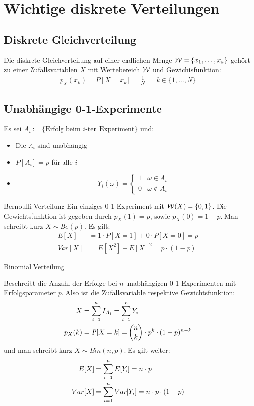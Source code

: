 \section{Wichtige diskrete Verteilungen}
\subsection{Diskrete Gleichverteilung}
Die diskrete Gleichverteilung auf einer endlichen Menge $\mathcal{W} = \{ x_1, \dots,
  x_n \}$ gehört zu einer Zufallsvariablen $X$ mit Wertebereich $\mathcal{W}$ und
Gewichtsfunktion:
\begin{align*}
  p_X (x_k) = P[X = x_k] = \frac{1}{N} &  & k \in \{1, \dots, N\}
\end{align*}
\subsection{Unabhängige 0-1-Experimente}
Es sei $A_i := \{\text{Erfolg beim $i$-ten Experiment}\}$ und:
\begin{itemize}
  \item Die $A_i$ sind unabhängig
  \item $P[A_i] = p$ für alle $i$
  \item \[
          Y_i (\omega) =
          \begin{cases}
            1 & \omega \in A_i      \\
            0 & \omega \not \in A_i
          \end{cases}
        \]
\end{itemize}
\begin{definition}{Bernoulli-Verteilung}
Ein einziges 0-1-Experiment mit $\mathcal{W} (X) = \{0, 1\}$. Die Gewichtsfunktion ist
gegeben durch $p_X (1) = p$, sowie $p_X (0) = 1-p$. Man schreibt kurz $X \sim
  Be (p)$. Es gilt:
\begin{align*}
  E[X]   & = 1 \cdot P[X = 1] + 0 \cdot P[X = 0] = p \\
  Var[X] & = E[X^2] - {E[X]}^2 = p \cdot  (1-p)
\end{align*}
\end{definition}
\begin{definition}{Binomial Verteilung}

Beschreibt die Anzahl der Erfolge bei $n$ unabhängigen 0-1-Experimenten mit
Erfolgsparameter $p$. Also ist die Zufallsvariable respektive Gewichtsfunktion:
\begin{align*}
  X       & = \sum_{i = 1}^n I_{A_i} = \sum_{i = 1}^n Y_i                                \\
  p_X (k) & = P[X = k] = \binom{n}{k} \cdot p^k \cdot  (1-p)^{n-k}
\end{align*}
und man schreibt kurz $X \sim Bin (n, p)$. Es gilt weiter:
\begin{align*}
  E[X]   & = \sum_{i = 1}^n E[Y_i] = n \cdot p                \\
  Var[X] & = \sum_{i = 1}^n Var[Y_i] = n \cdot p \cdot  (1-p)
\end{align*}
\end{definition}
